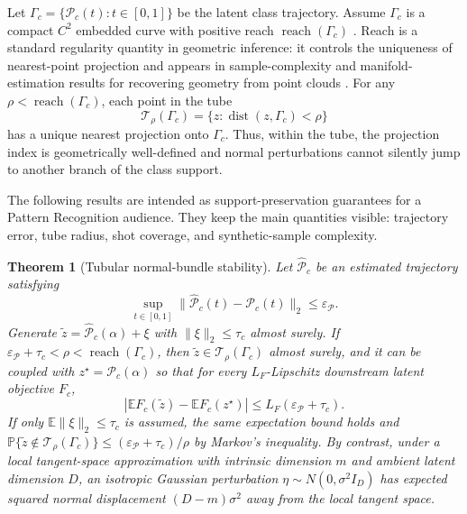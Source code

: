 \documentclass[preprint,12pt,number]{elsarticle}
\newtheorem{theorem}{Theorem}
\begin{document}
Let $\Gamma_c=\{\mathcal{P}_c(t):t\in[0,1]\}$ be the latent class trajectory. Assume $\Gamma_c$ is a compact $C^2$ embedded curve with positive reach $\operatorname{reach}(\Gamma_c)$ \citep{federer1959curvature}. Reach is a standard regularity quantity in geometric inference: it controls the uniqueness of nearest-point projection and appears in sample-complexity and manifold-estimation results for recovering geometry from point clouds \citep{niyogi2008finding, genovese2012manifold, aamari2019nonasymptotic}. For any $\rho<\operatorname{reach}(\Gamma_c)$, each point in the tube
\[
	\mathcal{T}_\rho(\Gamma_c)=\{z:\operatorname{dist}(z,\Gamma_c)<\rho\}
\]
has a unique nearest projection onto $\Gamma_c$. Thus, within the tube, the projection index is geometrically well-defined and normal perturbations cannot silently jump to another branch of the class support.

The following results are intended as support-preservation guarantees for a Pattern Recognition audience. They keep the main quantities visible: trajectory error, tube radius, shot coverage, and synthetic-sample complexity.

\begin{theorem}[Tubular normal-bundle stability]
	Let $\widehat{\mathcal{P}}_c$ be an estimated trajectory satisfying
	\[
	\sup_{t\in[0,1]}\lVert\widehat{\mathcal{P}}_c(t)-\mathcal{P}_c(t)\rVert_2\le \varepsilon_{\mathcal{P}}.
	\]
	Generate $\tilde z=\widehat{\mathcal{P}}_c(\alpha)+\xi$ with $\lVert\xi\rVert_2\le\tau_c$ almost surely. If $\varepsilon_{\mathcal{P}}+\tau_c<\rho<\operatorname{reach}(\Gamma_c)$, then $\tilde z\in\mathcal{T}_\rho(\Gamma_c)$ almost surely, and it can be coupled with $z^\star=\mathcal{P}_c(\alpha)$ so that for every $L_F$-Lipschitz downstream latent objective $F_c$,
	\[
	\left|\mathbb{E}F_c(\tilde z)-\mathbb{E}F_c(z^\star)\right|
	\le L_F(\varepsilon_{\mathcal{P}}+\tau_c).
	\]
	If only $\mathbb{E}\lVert\xi\rVert_2\le\tau_c$ is assumed, the same expectation bound holds and $\mathbb{P}\{\tilde z\notin\mathcal{T}_\rho(\Gamma_c)\}\le(\varepsilon_{\mathcal{P}}+\tau_c)/\rho$ by Markov's inequality. By contrast, under a local tangent-space approximation with intrinsic dimension $m$ and ambient latent dimension $D$, an isotropic Gaussian perturbation $\eta\sim N(0,\sigma^2 I_D)$ has expected squared normal displacement $(D-m)\sigma^2$ away from the local tangent space.
\end{theorem}
\end{document}
